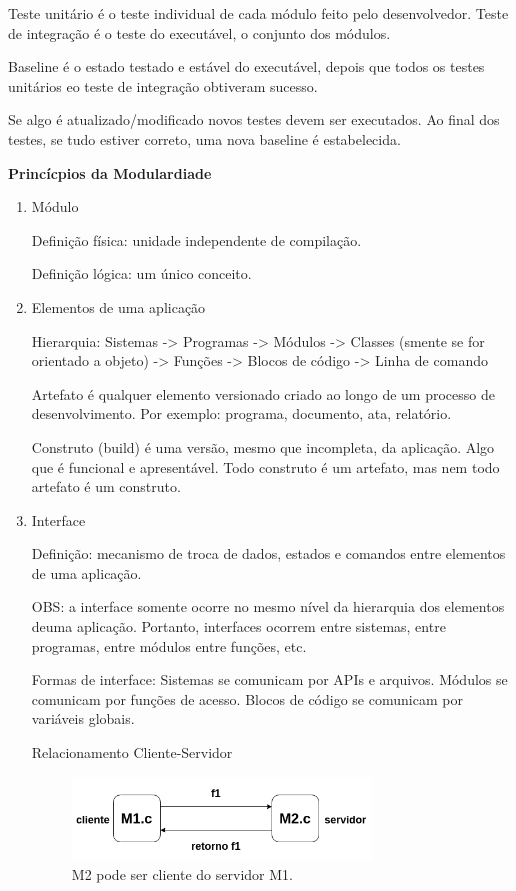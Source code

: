 \documentclass[
	12pt, %
]{fphw}
\begin{document}
\begin{doublespace}
    Teste unitário é o teste individual de cada módulo feito pelo desenvolvedor. Teste de integração é o teste do executável, o conjunto dos módulos.

    Baseline é o estado testado e estável do executável, depois que todos os testes unitários eo teste de integração obtiveram sucesso.

    Se algo é atualizado/modificado novos testes devem ser executados. Ao final dos testes, se tudo estiver correto, uma nova baseline é estabelecida.

    \textbf{Princícpios da Modulardiade}

    \begin{enumerate}

        \item Módulo

              Definição física: unidade independente de compilação.

              Definição lógica: um único conceito.

        \item Elementos de uma aplicação

              Hierarquia: Sistemas -> Programas -> Módulos -> Classes (smente se for orientado a objeto) -> Funções -> Blocos de código -> Linha de comando

              Artefato é qualquer elemento versionado criado ao longo de um processo de desenvolvimento. Por exemplo: programa, documento, ata, relatório.

              Construto (build) é uma versão, mesmo que incompleta, da aplicação. Algo que é funcional e apresentável. Todo construto é um artefato, mas nem todo artefato é um construto.

        \item Interface

              Definição: mecanismo de troca de dados, estados e comandos entre elementos de uma aplicação.

              OBS: a interface somente ocorre no mesmo nível da hierarquia dos elementos deuma aplicação. Portanto, interfaces ocorrem entre sistemas, entre programas, entre módulos entre funções, etc.

              Formas de interface: Sistemas se comunicam por APIs e arquivos. Módulos se comunicam por funções de acesso. Blocos de código se comunicam por variáveis globais.

              Relacionamento Cliente-Servidor

              \begin{figure}[h]
                  \centering
                  \includegraphics[width=0.75\textwidth]{clienteservidor.png}
                  \caption*{M2 pode ser cliente do servidor M1.}
              \end{figure}


\end{enumerate}
\end{doublespace}
\end{document}
